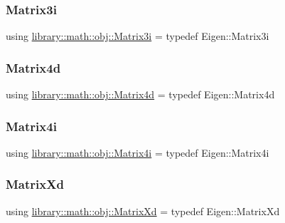 \subsubsection{\texorpdfstring{Matrix3i}{Matrix3i}}
{\footnotesize\ttfamily using \hyperlink{namespacelibrary_1_1math_1_1obj_a7e74feec88408f948fe6d4a18d274619}{library\+::math\+::obj\+::\+Matrix3i} = typedef Eigen\+::\+Matrix3i}

\mbox{\label{namespacelibrary_1_1math_1_1obj_adde130f80968bf89120e5ff29929bfed}} 
\subsubsection{\texorpdfstring{Matrix4d}{Matrix4d}}
{\footnotesize\ttfamily using \hyperlink{namespacelibrary_1_1math_1_1obj_adde130f80968bf89120e5ff29929bfed}{library\+::math\+::obj\+::\+Matrix4d} = typedef Eigen\+::\+Matrix4d}

\mbox{\label{namespacelibrary_1_1math_1_1obj_af485a47cffc7369c6b462b1a58b4db60}} 
\subsubsection{\texorpdfstring{Matrix4i}{Matrix4i}}
{\footnotesize\ttfamily using \hyperlink{namespacelibrary_1_1math_1_1obj_af485a47cffc7369c6b462b1a58b4db60}{library\+::math\+::obj\+::\+Matrix4i} = typedef Eigen\+::\+Matrix4i}

\mbox{\label{namespacelibrary_1_1math_1_1obj_a4da50132532e4544429d239909ccbd79}} 
\subsubsection{\texorpdfstring{Matrix\+Xd}{MatrixXd}}
{\footnotesize\ttfamily using \hyperlink{namespacelibrary_1_1math_1_1obj_a4da50132532e4544429d239909ccbd79}{library\+::math\+::obj\+::\+Matrix\+Xd} = typedef Eigen\+::\+Matrix\+Xd}


